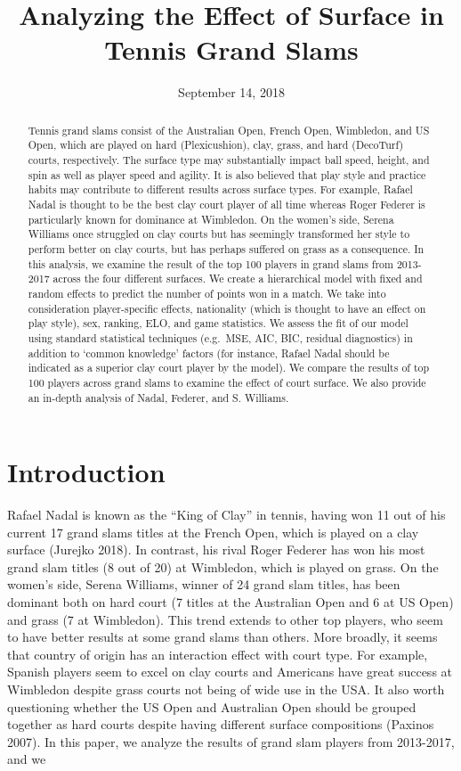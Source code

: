 \documentclass[]{article}
\title{Analyzing the Effect of Surface in Tennis Grand Slams}
\author{}
\date{September 14, 2018}
\begin{document}
\maketitle
\begin{abstract}
Tennis grand slams consist of the Australian Open, French Open,
Wimbledon, and US Open, which are played on hard (Plexicushion), clay,
grass, and hard (DecoTurf) courts, respectively. The surface type may
substantially impact ball speed, height, and spin as well as player
speed and agility. It is also believed that play style and practice
habits may contribute to different results across surface types. For
example, Rafael Nadal is thought to be the best clay court player of all
time whereas Roger Federer is particularly known for dominance at
Wimbledon. On the women's side, Serena Williams once struggled on clay
courts but has seemingly transformed her style to perform better on clay
courts, but has perhaps suffered on grass as a consequence. In this
analysis, we examine the result of the top 100 players in grand slams
from 2013-2017 across the four different surfaces. We create a
hierarchical model with fixed and random effects to predict the number
of points won in a match. We take into consideration player-specific
effects, nationality (which is thought to have an effect on play style),
sex, ranking, ELO, and game statistics. We assess the fit of our model
using standard statistical techniques (e.g.~MSE, AIC, BIC, residual
diagnostics) in addition to `common knowledge' factors (for instance,
Rafael Nadal should be indicated as a superior clay court player by the
model). We compare the results of top 100 players across grand slams to
examine the effect of court surface. We also provide an in-depth
analysis of Nadal, Federer, and S. Williams.
\end{abstract}

{
\setcounter{tocdepth}{2}
\tableofcontents
}
\section{Introduction}\label{sec:iintro}

Rafael Nadal is known as the ``King of Clay'' in tennis, having won 11
out of his current 17 grand slams titles at the French Open, which is
played on a clay surface (Jurejko 2018). In contrast, his rival Roger
Federer has won his most grand slam titles (8 out of 20) at Wimbledon,
which is played on grass. On the women's side, Serena Williams, winner
of 24 grand slam titles, has been dominant both on hard court (7 titles
at the Australian Open and 6 at US Open) and grass (7 at Wimbledon).
This trend extends to other top players, who seem to have better results
at some grand slams than others. More broadly, it seems that country of
origin has an interaction effect with court type. For example, Spanish
players seem to excel on clay courts and Americans have great success at
Wimbledon despite grass courts not being of wide use in the USA. It also
worth questioning whether the US Open and Australian Open should be
grouped together as hard courts despite having different surface
compositions (Paxinos 2007). In this paper, we analyze the results of
grand slam players from 2013-2017, and we
\end{document}
